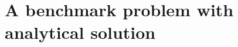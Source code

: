\documentclass[r]{siamart171218}
\begin{document}





\section{A benchmark problem with analytical solution}
\end{document}
